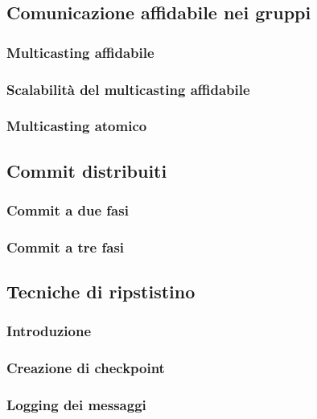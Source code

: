 \subsection{Comunicazione affidabile nei gruppi}
\subsubsection{Multicasting affidabile}
\subsubsection{Scalabilità del multicasting affidabile}
\subsubsection{Multicasting atomico}
\subsection{Commit distribuiti}
\subsubsection{Commit a due fasi}
\subsubsection{Commit a tre fasi}
\subsection{Tecniche di ripstistino}
\subsubsection{Introduzione}
\subsubsection{Creazione di checkpoint}
\subsubsection{Logging dei messaggi}